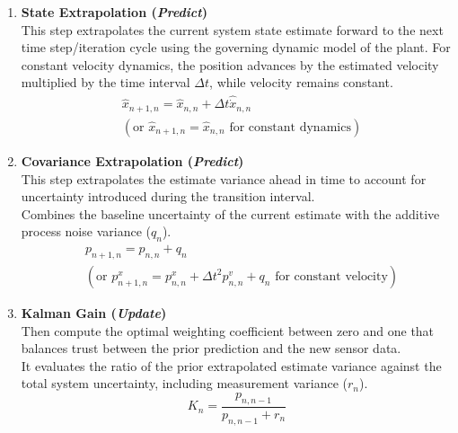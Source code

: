 \begin{enumerate}[label=\textbf{Step \arabic*:}, leftmargin=*, itemsep=1em]
	
	\item \textbf{State Extrapolation (\emph{Predict})}\\
	This step extrapolates the current system state estimate forward to the next time step/iteration cycle using the governing dynamic model of the plant. For constant velocity dynamics, the position advances by the estimated velocity multiplied by the time interval $\Delta t$, while velocity remains constant.
	\begin{equation}
		\begin{split}
			&\hat{x}_{n+1,n} = \hat{x}_{n,n} + \Delta t \hat{\dot{x}}_{n,n} \\ 
			& (\text{or } \hat{x}_{n+1,n} = \hat{x}_{n,n} \text{ for constant dynamics})
		\end{split}
	\end{equation}
	
	\item \textbf{Covariance Extrapolation (\emph{Predict})}\\
	This step extrapolates the estimate variance ahead in time to account for uncertainty introduced during the transition interval.%
	\\
	Combines the baseline uncertainty of the current estimate with the additive process noise variance ($q_n$).
	\begin{equation}
		\begin{split}
			&p_{n+1,n} = p_{n,n} + q_n \\ 
			& (\text{or } p_{n+1,n}^x = p_{n,n}^x + \Delta t^2 p_{n,n}^v + q_n \text{ for constant velocity})
		\end{split}
	\end{equation}
	
	\item \textbf{Kalman Gain (\emph{Update})}\\
	Then compute the optimal weighting coefficient between zero and one that balances trust between the prior prediction and the new sensor data.\\
	 It evaluates the ratio of the prior extrapolated estimate variance against the total system uncertainty, including measurement variance ($r_n$).
	\begin{equation}
		K_n = \frac{p_{n,n-1}}{p_{n,n-1} + r_n}
	\end{equation}
	

\end{enumerate}
